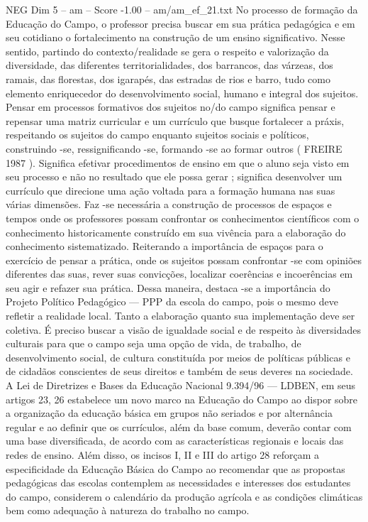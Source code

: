 \begin{textsample}{NEG Dim 5 – am – Score -1.00 – am/am\_ef\_21.txt}
No processo de formação da Educação do Campo, o professor precisa buscar em sua prática pedagógica e em seu cotidiano o fortalecimento na construção de um ensino significativo.
Nesse sentido, partindo do contexto/realidade se gera o respeito e valorização da diversidade, das diferentes territorialidades, dos barrancos, das várzeas, dos ramais, das florestas, dos igarapés, das estradas de rios e barro, tudo como elemento enriquecedor do desenvolvimento social, humano e integral dos sujeitos.
Pensar em processos formativos dos sujeitos no/do campo significa pensar e repensar uma matriz curricular e um currículo que busque fortalecer a práxis, respeitando os sujeitos do campo enquanto sujeitos sociais e políticos, construindo -se, ressignificando -se, formando -se ao formar outros ( FREIRE 1987 ).
Significa efetivar procedimentos de ensino em que o aluno seja visto em seu processo e não no resultado que ele possa gerar ; significa desenvolver um currículo que direcione uma ação voltada para a formação humana nas suas várias dimensões.
Faz -se necessária a construção de processos de espaços e tempos onde os professores possam confrontar os conhecimentos científicos com o conhecimento historicamente construído em sua vivência para a elaboração do conhecimento sistematizado.
Reiterando a importância de espaços para o exercício de pensar a prática, onde os sujeitos possam confrontar -se com opiniões diferentes das suas, rever suas convicções, localizar coerências e incoerências em seu agir e refazer sua prática.
Dessa maneira, destaca -se a importância do Projeto Político Pedagógico — PPP da escola do campo, pois o mesmo deve refletir a realidade local.
Tanto a elaboração quanto sua implementação deve ser coletiva.
É preciso buscar a visão de igualdade social e de respeito às diversidades culturais para que o campo seja uma opção de vida, de trabalho, de desenvolvimento social, de cultura constituída por meios de políticas públicas e de cidadãos conscientes de seus direitos e também de seus deveres na sociedade.
A Lei de Diretrizes e Bases da Educação Nacional 9.394/96 — LDBEN, em seus artigos 23, 26 estabelece um novo marco na Educação do Campo ao dispor sobre a organização da educação básica em grupos não seriados e por alternância regular e ao definir que os currículos, além da base comum, deverão contar com uma base diversificada, de acordo com as características regionais e locais das redes de ensino.
Além disso, os incisos I, II e III do artigo 28 reforçam a especificidade da Educação Básica do Campo ao recomendar que as propostas pedagógicas das escolas contemplem as necessidades e interesses dos estudantes do campo, considerem o calendário da produção agrícola e as condições climáticas bem como adequação à natureza do trabalho no campo.

\end{textsample}
